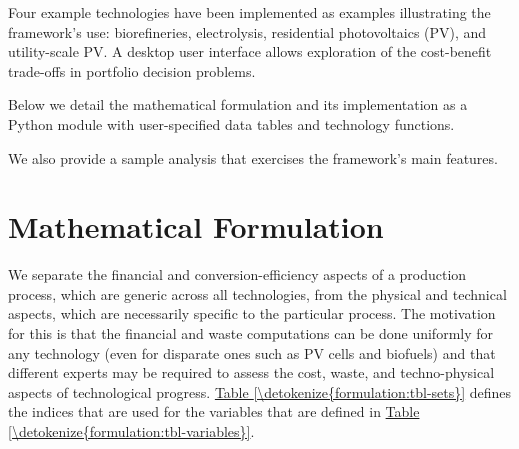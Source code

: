 \documentclass[letterpaper,10pt,english]{sphinxmanual}
\begin{document}
Four example technologies have been implemented as examples illustrating the
framework’s use: biorefineries, electrolysis, residential photovoltaics
(PV), and utility-scale PV. A desktop user interface allows exploration
of the cost-benefit trade-offs in portfolio decision problems.

Below we detail the mathematical formulation and its implementation as a
Python module with user-specified data tables and technology functions.

We also provide a sample analysis that exercises the framework’s main
features.


\chapter{Mathematical Formulation}
\label{\detokenize{formulation:mathematical-formulation}}\label{\detokenize{formulation:sec-formulation}}\label{\detokenize{formulation::doc}}
We separate the financial and conversion-efficiency aspects of a
production process, which are generic across all technologies, from the
physical and technical aspects, which are necessarily specific to the
particular process. The motivation for this is that the financial and
waste computations can be done uniformly for any technology (even for
disparate ones such as PV cells and biofuels) and that different experts
may be required to assess the cost, waste, and techno-physical aspects
of technological progress. \hyperref[\detokenize{formulation:tbl-sets}]{Table \ref{\detokenize{formulation:tbl-sets}}} defines the indices that are used
for the variables that are defined in \hyperref[\detokenize{formulation:tbl-variables}]{Table \ref{\detokenize{formulation:tbl-variables}}}.
\end{document}
